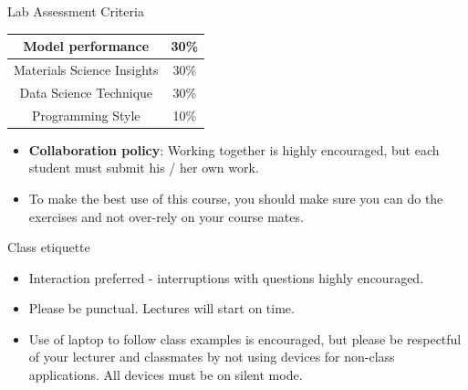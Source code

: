 \documentclass[aspectratio=169]{beamer}
\begin{document}
\begin{frame}{Lab Assessment Criteria}
\begin{table}[]
    \centering
    \begin{tabular}{|c|c|}
    \hline
Model performance & 30\%\\
\hline
Materials Science Insights & 30\%\\
\hline
Data Science Technique & 30\%\\
\hline
Programming Style & 10\%\\
\hline
    \end{tabular}
\end{table}
    \begin{itemize}
        \item \textbf{Collaboration policy}:  Working together is highly encouraged, but each student must submit his / her own work. 
        \item To make the best use of this course, you should make sure you can do the exercises and not over-rely on your course mates.
    \end{itemize}
\end{frame}


\begin{frame}{Class etiquette}
    \begin{itemize}
        \item Interaction preferred - interruptions with questions highly encouraged.
        \item Please be punctual. Lectures will start on time.
        \item Use of laptop to follow class examples is encouraged, but please be respectful of your lecturer and classmates by not using devices for non-class applications.  All devices must be on silent mode.
    \end{itemize}
\end{frame}
\end{document}
